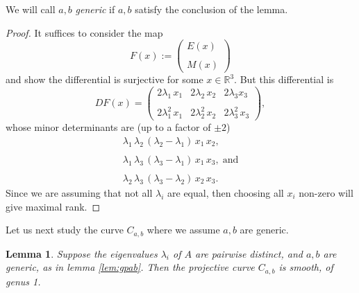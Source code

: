 \documentclass[12pt,reqno]{amsart}\usepackage{amssymb,amsmath,amscd,epsfig,amsthm,enumerate,import,eufrak}
\newtheorem{lemma}[theorem]{Lemma}
\theoremstyle{definition}
\theoremstyle{remark}
\numberwithin{equation}{section}
\theoremstyle{plain}
\theoremstyle{definition}
\def \r {\mathbb{R}}
\def \vs {\vskip 2mm}
\theoremstyle{remark}
\numberwithin{theorem}{section}
\begin{document}
% 
We will call $a, b$ {\em generic} if $a, b$ satisfy the conclusion of the lemma.
%
\begin{proof}
It suffices to consider the map 
%
\[
	F(x) := \left(\begin{array}{c} E(x) \\  \\ M(x) \end{array}\right)
\]
%
and show the differential is surjective for some $x \in \r^3$. But this differential is
%
\[
	DF(x) = \left(\begin{array}{ccc} 2\lambda_1 \, x_1 & 2\lambda_2 \, x_2 & 2\lambda_3 x_3 \\ & & \\ 2\lambda_1^2 \, x_1 & 2\lambda_2^2 \, x_2 & 2\lambda_3^2 \, x_3 \end{array} \right),
\]
%
whose minor determinants are (up to a factor of $\pm2$) 
%
\[
\begin{array}{l}
	\lambda_1 \, \lambda_2 \, (\lambda_2 - \lambda_1) \, x_1 \, x_2,\\
	\\
	\lambda_1 \, \lambda_3 \, (\lambda_3 - \lambda_1) \, x_1 \, x_3, \; \text{and}\\
	\\
	\lambda_2 \, \lambda_3 \, (\lambda_3 - \lambda_2) \, x_2 \, x_3.
\end{array}
\]
%
Since we are assuming that not all $\lambda_i$ are equal, then choosing all $x_i$ non-zero will give maximal rank. 
\end{proof}
%
%
\vs
%
Let us next study the curve $C_{a,b}$ where we assume $a, b$ are generic. 
\vs
\begin{lemma} \label{lem:lambdadistinct}
	Suppose the eigenvalues $\lambda_i$ of $A$ are pairwise distinct, and $a, b$ are generic, as in lemma \ref{lem:gpab}. Then the projective curve $C_{a,b}$ is smooth, of genus 1.
\end{lemma}
%
\end{document}
